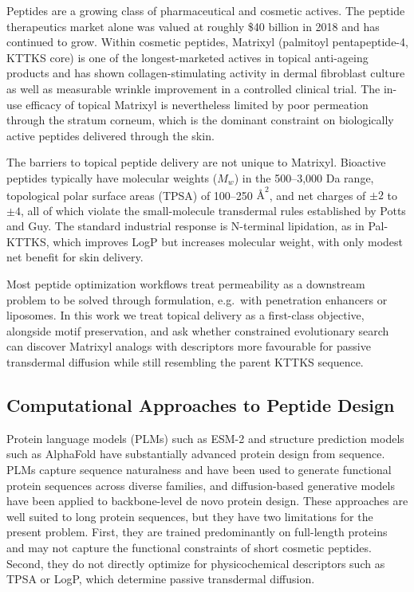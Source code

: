 \documentclass[11pt,letterpaper]{article}
\begin{document}
Peptides are a growing class of pharmaceutical and cosmetic actives. The peptide therapeutics market alone was valued at roughly \$40 billion in 2018 and has continued to grow\cite{henninot2018}. Within cosmetic peptides, Matrixyl (palmitoyl pentapeptide-4, KTTKS core) is one of the longest-marketed actives in topical anti-ageing products and has shown collagen-stimulating activity in dermal fibroblast culture as well as measurable wrinkle improvement in a controlled clinical trial\cite{robinson2005}. The in-use efficacy of topical Matrixyl is nevertheless limited by poor permeation through the stratum corneum, which is the dominant constraint on biologically active peptides delivered through the skin\cite{mitragotri2014}.

The barriers to topical peptide delivery are not unique to Matrixyl. Bioactive peptides typically have molecular weights ($M_w$) in the 500--3,000 Da range, topological polar surface areas (TPSA) of 100--250 $\text{\AA}^2$, and net charges of $\pm 2$ to $\pm 4$, all of which violate the small-molecule transdermal rules established by Potts and Guy\cite{potts1992}. The standard industrial response is N-terminal lipidation, as in Pal-KTTKS, which improves LogP but increases molecular weight, with only modest net benefit for skin delivery\cite{lintner2000}.

Most peptide optimization workflows treat permeability as a downstream problem to be solved through formulation, e.g.\ with penetration enhancers or liposomes. In this work we treat topical delivery as a first-class objective, alongside motif preservation, and ask whether constrained evolutionary search can discover Matrixyl analogs with descriptors more favourable for passive transdermal diffusion while still resembling the parent KTTKS sequence.

\subsection{Computational Approaches to Peptide Design}

Protein language models (PLMs) such as ESM-2\cite{esm2023} and structure prediction models such as AlphaFold\cite{alphafold2021} have substantially advanced protein design from sequence. PLMs capture sequence naturalness and have been used to generate functional protein sequences across diverse families\cite{madani2023}, and diffusion-based generative models have been applied to backbone-level de novo protein design\cite{watson2023}. These approaches are well suited to long protein sequences, but they have two limitations for the present problem. First, they are trained predominantly on full-length proteins and may not capture the functional constraints of short cosmetic peptides. Second, they do not directly optimize for physicochemical descriptors such as TPSA or LogP, which determine passive transdermal diffusion.
\end{document}
